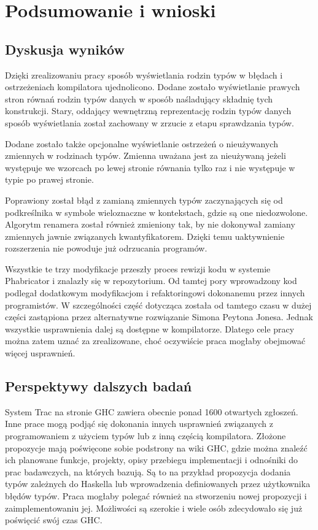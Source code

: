 \chapter{Podsumowanie i wnioski}\label{chap:podsumowanie}

\section{Dyskusja wyników}

Dzięki zrealizowaniu pracy sposób wyświetlania rodzin typów w błędach i
ostrzeżeniach kompilatora ujednolicono. Dodane zostało wyświetlanie prawych
stron równań rodzin typów danych w sposób naśladujący składnię tych
konstrukcji. Stary, oddający wewnętrzną reprezentację rodzin typów danych sposób
wyświetlania został zachowany w zrzucie z etapu sprawdzania typów.

Dodane zostało także opcjonalne wyświetlanie ostrzeżeń o nieużywanych zmiennych
w rodzinach typów. Zmienna uważana jest za nieużywaną jeżeli występuje we
wzorcach po lewej stronie równania tylko raz i nie występuje w typie po prawej
stronie.

Poprawiony został błąd z zamianą zmiennych typów zaczynających się od
podkreślnika w symbole wieloznaczne w kontekstach, gdzie są one
niedozwolone. Algorytm renamera został również zmieniony tak, by nie dokonywał
zamiany zmiennych jawnie związanych kwantyfikatorem. Dzięki temu uaktywnienie
rozszerzenia  nie powoduje już odrzucania programów.

Wszystkie te trzy modyfikacje przeszły proces rewizji kodu w systemie
Phabricator i znalazły się w repozytorium. Od tamtej pory wprowadzony kod
podlegał dodatkowym modyfikacjom i refaktoringowi dokonanemu przez innych
programistów. W szczególności część dotycząca  została od
tamtego czasu w dużej części zastąpiona przez alternatywne rozwiązanie Simona
Peytona Jonesa. Jednak wszystkie usprawnienia dalej są dostępne w
kompilatorze. Dlatego cele pracy można zatem uznać za zrealizowane, choć
oczywiście praca mogłaby obejmować więcej usprawnień.

\section{Perspektywy dalszych badań}
System Trac na stronie GHC zawiera obecnie ponad 1600 otwartych
zgłoszeń\cite{WikiTickets}. Inne prace mogą podjąć się dokonania innych
usprawnień związanych z programowaniem z użyciem typów lub z inną częścią
kompilatora. Złożone propozycje mają poświęcone sobie podstrony na wiki GHC,
gdzie można znaleźć ich planowane funkcje, projekty, opisy przebiegu
implementacji i odnośniki do prac badawczych, na których bazują. Są to na
przykład propozycja dodania typów zależnych do Haskella lub wprowadzenia
definiowanych przez użytkownika błędów typów. Praca mogłaby polegać również na
stworzeniu nowej propozycji i zaimplementowaniu jej. Możliwości są szerokie i
wiele osób zdecydowało się już poświęcić swój czas GHC.

